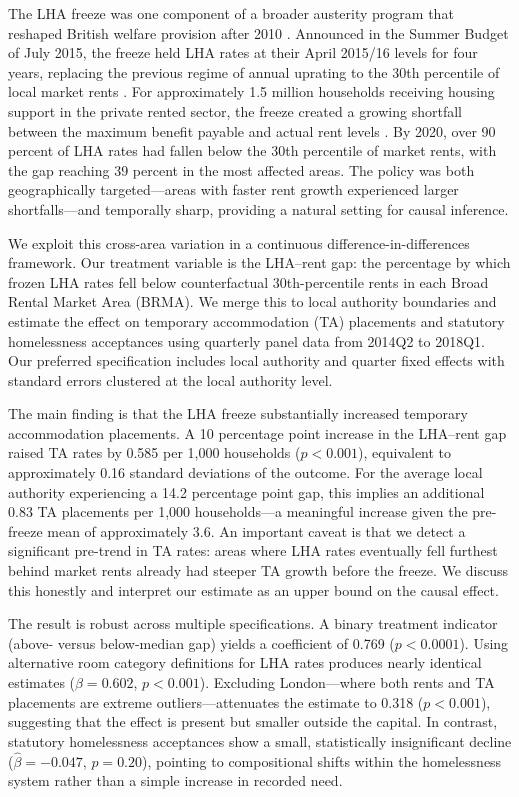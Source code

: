 \documentclass[12pt]{article}
\begin{document}
The LHA freeze was one component of a broader austerity program that reshaped British welfare provision after 2010 \citep{beatty2014}. Announced in the Summer Budget of July 2015, the freeze held LHA rates at their April 2015/16 levels for four years, replacing the previous regime of annual uprating to the 30th percentile of local market rents \citep{hm2015}. For approximately 1.5 million households receiving housing support in the private rented sector, the freeze created a growing shortfall between the maximum benefit payable and actual rent levels \citep{wilson2019}. By 2020, over 90 percent of LHA rates had fallen below the 30th percentile of market rents, with the gap reaching 39 percent in the most affected areas. The policy was both geographically targeted---areas with faster rent growth experienced larger shortfalls---and temporally sharp, providing a natural setting for causal inference.

We exploit this cross-area variation in a continuous difference-in-differences framework. Our treatment variable is the LHA--rent gap: the percentage by which frozen LHA rates fell below counterfactual 30th-percentile rents in each Broad Rental Market Area (BRMA). We merge this to local authority boundaries and estimate the effect on temporary accommodation (TA) placements and statutory homelessness acceptances using quarterly panel data from 2014Q2 to 2018Q1. Our preferred specification includes local authority and quarter fixed effects with standard errors clustered at the local authority level.

The main finding is that the LHA freeze substantially increased temporary accommodation placements. A 10 percentage point increase in the LHA--rent gap raised TA rates by 0.585 per 1,000 households ($p < 0.001$), equivalent to approximately 0.16 standard deviations of the outcome. For the average local authority experiencing a 14.2 percentage point gap, this implies an additional 0.83 TA placements per 1,000 households---a meaningful increase given the pre-freeze mean of approximately 3.6. An important caveat is that we detect a significant pre-trend in TA rates: areas where LHA rates eventually fell furthest behind market rents already had steeper TA growth before the freeze. We discuss this honestly and interpret our estimate as an upper bound on the causal effect.

The result is robust across multiple specifications. A binary treatment indicator (above- versus below-median gap) yields a coefficient of 0.769 ($p < 0.0001$). Using alternative room category definitions for LHA rates produces nearly identical estimates ($\hat{\beta} = 0.602$, $p < 0.001$). Excluding London---where both rents and TA placements are extreme outliers---attenuates the estimate to 0.318 ($p < 0.001$), suggesting that the effect is present but smaller outside the capital. In contrast, statutory homelessness acceptances show a small, statistically insignificant decline ($\hat{\beta} = -0.047$, $p = 0.20$), pointing to compositional shifts within the homelessness system rather than a simple increase in recorded need.
\end{document}
